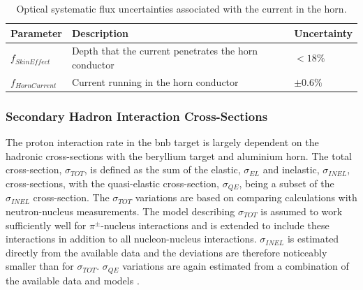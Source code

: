 \begin{table}[!h]
  \renewcommand{\arraystretch}{1.4}    
  \begin{tabular}{p{2.5cm} p{7.8cm} p{2.2cm}}

    \toprule
    Parameter & Description & Uncertainty \\ 
    \midrule

    $f_{SkinEffect}$  & Depth that the current penetrates the horn conductor & $<18 \%$\\

    $f_{HornCurrent}$ & Current running in the horn conductor & $\pm 0.6 \%$\\
    \bottomrule

  \end{tabular}
  \caption[Optical, beam focusing flux systematic parameters.]{Optical systematic flux uncertainties associated with the current in the horn\cite{BNB_flux}.}
\end{table}

\newpage
\subsubsection*{Secondary Hadron Interaction Cross-Sections}
The proton interaction rate in the \gls{bnb} target is largely dependent on the hadronic cross-sections with the beryllium target and aluminium horn. %
The total cross-section, $\sigma_{TOT}$, is defined as the sum of the elastic, $\sigma_{EL}$ and inelastic, $\sigma_{INEL}$, cross-sections, with the quasi-elastic cross-section, $\sigma_{QE}$, being a subset of the  $\sigma_{INEL}$ cross-section. The $\sigma_{TOT}$ variations are based on comparing calculations with neutron-nucleus measurements. The model describing $\sigma_{TOT}$ is assumed to work sufficiently well for $\pi^{\pm}$-nucleus interactions and is extended to include these interactions in addition to all nucleon-nucleus interactions. $\sigma_{INEL}$ is estimated directly from the available data and the deviations are therefore noticeably smaller than for $\sigma_{TOT}$. %
$\sigma_{QE}$ variations are again estimated from a combination of the available data and models \cite{BNB_flux}. %

